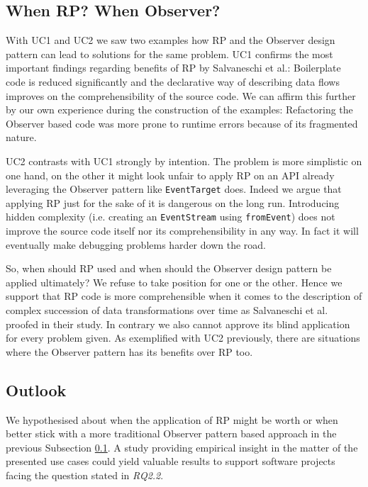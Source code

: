 \documentclass[12pt,a4paper]{article}
\begin{document}
\subsection{When RP? When Observer?}
\label{sec:when-rp-when-observer}

With UC1 and UC2 we saw two examples how RP and the Observer design pattern can lead to solutions for the same problem. UC1 confirms the most important findings regarding benefits of RP by Salvaneschi et al.: Boilerplate code is reduced significantly and the declarative way of describing data flows improves on the comprehensibility of the source code. We can affirm this further by our own experience during the construction of the examples: Refactoring the Observer based code was more prone to runtime errors because of its fragmented nature.

UC2 contrasts with UC1 strongly by intention. The problem is more simplistic on one hand, on the other it might look unfair to apply RP on an API already leveraging the Observer pattern like \texttt{EventTarget} does. Indeed we argue that applying RP just for the sake of it is dangerous on the long run. Introducing hidden complexity (i.e. creating an \texttt{EventStream} using \texttt{fromEvent}) does not improve the source code itself nor its comprehensibility in any way. In fact it will eventually make debugging problems harder down the road.

So, when should RP used and when should the Observer design pattern be applied ultimately? We refuse to take position for one or the other. Hence we support that RP code is more comprehensible when it comes to the description of complex succession of data transformations over time as Salvaneschi et al. proofed in their study. In contrary we also cannot approve its blind application for every problem given. As exemplified with UC2 previously, there are situations where the Observer pattern has its benefits over RP too.

\subsection{Outlook}

We hypothesised about when the application of RP might be worth or when better stick with a more traditional Observer pattern based approach in the previous Subsection \ref{sec:when-rp-when-observer}. A study providing empirical insight in the matter of the presented use cases could yield valuable results to support software projects facing the question stated in \emph{RQ2.2}.
\end{document}
